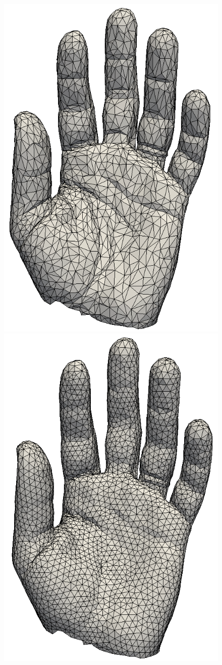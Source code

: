 \documentclass[letter,11pt]{article}
\begin{document}
\begin{figure}
\begin{minipage}{.30\textwidth}
    \includegraphics[width=0.7\linewidth]{../image/hand_0.png}
  \end{minipage} 
  \begin{minipage}{0.30\textwidth}
    \centering
    \includegraphics[width=0.7\linewidth]{../image/hand_b.png}

\end{minipage}
\end{figure}
\end{document}
